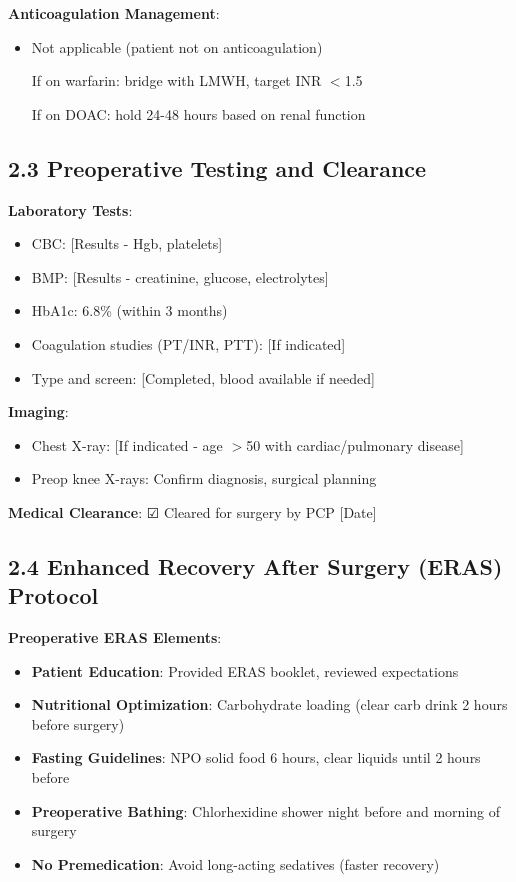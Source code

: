 \documentclass[11pt,letterpaper]{article}
\begin{document}
\textbf{Anticoagulation Management}:
\begin{itemize}[leftmargin=*]
    \item Not applicable (patient not on anticoagulation)
    \item [If on warfarin: bridge with LMWH, target INR $<$1.5]
    \item [If on DOAC: hold 24-48 hours based on renal function]
\end{itemize}

\subsection*{2.3 Preoperative Testing and Clearance}

\textbf{Laboratory Tests}:
\begin{itemize}[leftmargin=*]
    \item CBC: [Results - Hgb, platelets]
    \item BMP: [Results - creatinine, glucose, electrolytes]
    \item HbA1c: 6.8\% (within 3 months)
    \item Coagulation studies (PT/INR, PTT): [If indicated]
    \item Type and screen: [Completed, blood available if needed]
\end{itemize}

\textbf{Imaging}:
\begin{itemize}[leftmargin=*]
    \item Chest X-ray: [If indicated - age $>$50 with cardiac/pulmonary disease]
    \item Preop knee X-rays: Confirm diagnosis, surgical planning
\end{itemize}

\textbf{Medical Clearance}: ☑ Cleared for surgery by PCP [Date]

\subsection*{2.4 Enhanced Recovery After Surgery (ERAS) Protocol}

\textbf{Preoperative ERAS Elements}:
\begin{itemize}[leftmargin=*]
    \item \textbf{Patient Education}: Provided ERAS booklet, reviewed expectations
    \item \textbf{Nutritional Optimization}: Carbohydrate loading (clear carb drink 2 hours before surgery)
    \item \textbf{Fasting Guidelines}: NPO solid food 6 hours, clear liquids until 2 hours before
    \item \textbf{Preoperative Bathing}: Chlorhexidine shower night before and morning of surgery
    \item \textbf{No Premedication}: Avoid long-acting sedatives (faster recovery)
\end{itemize}
\end{document}
